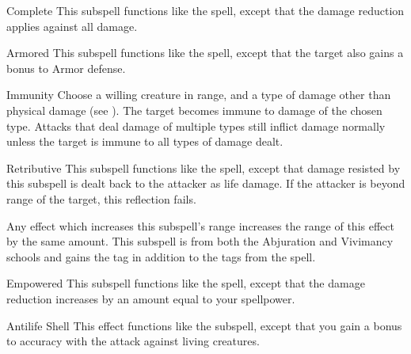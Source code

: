 \begin{ability}[\nth{3}]{Complete}
This subspell functions like the  spell, except that the damage reduction applies against all damage.
\end{ability}
\vspace{0.25em}


\begin{ability}[\nth{4}]{Armored}
This subspell functions like the  spell, except that the target also gains a  bonus to Armor defense.
\end{ability}
\vspace{0.25em}


\begin{ability}[\nth{4}]{Immunity}
Choose a willing creature in \rngclose range, and a type of damage other than physical damage (see ).
The target becomes immune to damage of the chosen type.
Attacks that deal damage of multiple types still inflict damage normally unless the target is immune to all types of damage dealt.
\end{ability}
\vspace{0.25em}


\begin{ability}[\nth{4}]{Retributive}
This subspell functions like the  spell, except that damage resisted by this subspell is dealt back to the attacker as life damage.
If the attacker is beyond \rngclose range of the target, this reflection fails.

Any effect which increases this subspell's range increases the range of this effect by the same amount.
This subspell is from both the Abjuration and Vivimancy schools and gains the  tag in addition to the tags from the  spell.
\end{ability}
\vspace{0.25em}


\begin{ability}[\nth{5}]{Empowered}
This subspell functions like the  spell, except that the damage reduction increases by an amount equal to your spellpower.
\end{ability}
\vspace{0.25em}


\begin{ability}[\nth{7}]{Antilife Shell}
This effect functions like the  subspell, except that you gain a  bonus to accuracy with the attack against living creatures.
\end{ability}
\vspace{0.25em}

